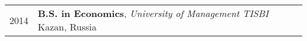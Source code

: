 %
%
%



\begin{tabular}{rl}	
	\textsc{2014} 	&  \textbf{B.S. in Economics},  \emph{University of Management TISBI} Kazan, Russia\\
\end{tabular}